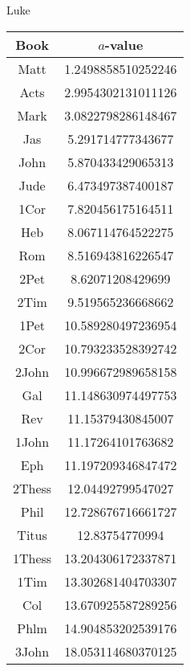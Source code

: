 \documentclass[12pt,letterpaper]{article}
\begin{document}
Luke
\begin{longtable}{|c|c|}
\hline
 Book & $a$-value \\ \hline
Matt & 1.2498858510252246 \\ \hline
 Acts & 2.9954302131011126 \\ \hline
 Mark & 3.0822798286148467 \\ \hline
 Jas & 5.291714777343677 \\ \hline
 John & 5.870433429065313 \\ \hline
 Jude & 6.473497387400187 \\ \hline
 1Cor & 7.820456175164511 \\ \hline
 Heb & 8.067114764522275 \\ \hline
 Rom & 8.516943816226547 \\ \hline
 2Pet & 8.62071208429699 \\ \hline
 2Tim & 9.519565236668662 \\ \hline
 1Pet & 10.589280497236954 \\ \hline
 2Cor & 10.793233528392742 \\ \hline
 2John & 10.996672989658158 \\ \hline
 Gal & 11.148630974497753 \\ \hline
 Rev & 11.15379430845007 \\ \hline
 1John & 11.17264101763682 \\ \hline
 Eph & 11.197209346847472 \\ \hline
 2Thess & 12.04492799547027 \\ \hline
 Phil & 12.728676716661727 \\ \hline
 Titus & 12.83754770994 \\ \hline
 1Thess & 13.204306172337871 \\ \hline
 1Tim & 13.302681404703307 \\ \hline
 Col & 13.670925587289256 \\ \hline
 Phlm & 14.904853202539176 \\ \hline
 3John & 18.053114680370125 \\ \hline 
\end{longtable}
\end{document}
